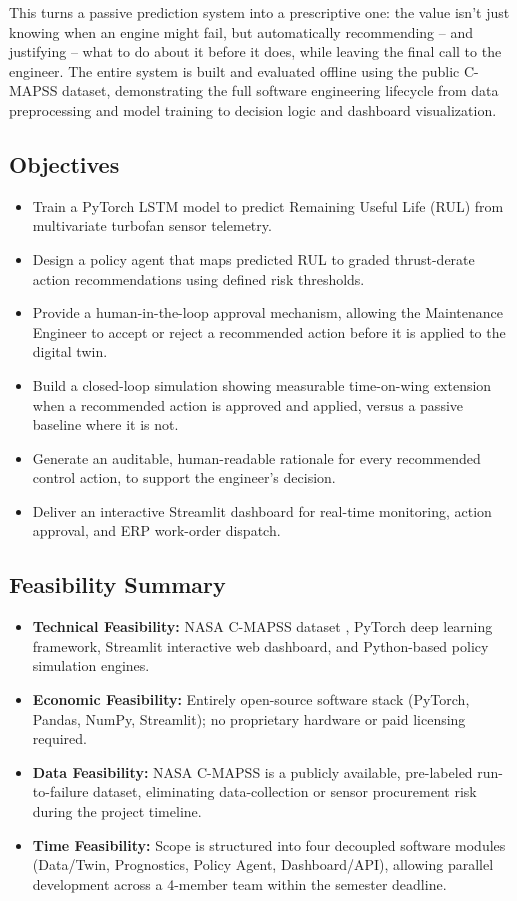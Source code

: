 \documentclass[12pt,a4paper]{report}
\begin{document}
This turns a passive prediction system into a prescriptive one: the value isn't just knowing when an engine might fail, but automatically recommending -- and justifying -- what to do about it before it does, while leaving the final call to the engineer. The entire system is built and evaluated offline using the public C-MAPSS dataset, demonstrating the full software engineering lifecycle from data preprocessing and model training to decision logic and dashboard visualization.

\subsection*{Objectives}
\begin{itemize}
    \item Train a PyTorch LSTM model to predict Remaining Useful Life (RUL) from multivariate turbofan sensor telemetry.
    \item Design a policy agent that maps predicted RUL to graded thrust-derate action recommendations using defined risk thresholds.
    \item Provide a human-in-the-loop approval mechanism, allowing the Maintenance Engineer to accept or reject a recommended action before it is applied to the digital twin.
    \item Build a closed-loop simulation showing measurable time-on-wing extension when a recommended action is approved and applied, versus a passive baseline where it is not.
    \item Generate an auditable, human-readable rationale for every recommended control action, to support the engineer's decision.
    \item Deliver an interactive Streamlit dashboard for real-time monitoring, action approval, and ERP work-order dispatch.
\end{itemize}
 
\subsection*{Feasibility Summary}
\begin{itemize}
    \item \textbf{Technical Feasibility:} NASA C-MAPSS dataset , PyTorch deep learning framework, Streamlit interactive web dashboard, and Python-based policy simulation engines.
    \item \textbf{Economic Feasibility:} Entirely open-source software stack (PyTorch, Pandas, NumPy, Streamlit); no proprietary hardware or paid licensing required.
    \item \textbf{Data Feasibility:} NASA C-MAPSS is a publicly available, pre-labeled run-to-failure dataset, eliminating data-collection or sensor procurement risk during the project timeline.
    \item \textbf{Time Feasibility:} Scope is structured into four decoupled software modules (Data/Twin, Prognostics, Policy Agent, Dashboard/API), allowing parallel development across a 4-member team within the semester deadline.
\end{itemize}
 
\end{document}
